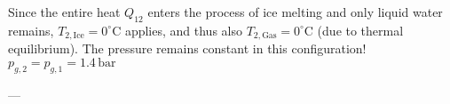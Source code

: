Since the entire heat \( Q_{12} \) enters the process of ice melting and only liquid water remains, \( T_{2, \text{Ice}} = 0^\circ \text{C} \) applies, and thus also \( T_{2, \text{Gas}} = 0^\circ \text{C} \) (due to thermal equilibrium).  
The pressure remains constant in this configuration!  
\( p_{g,2} = p_{g,1} = 1.4 \, \text{bar} \)  

---
